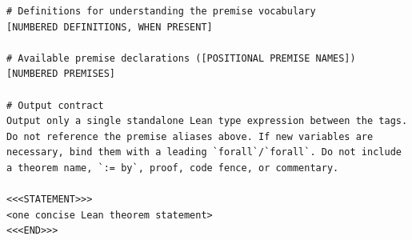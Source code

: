\begin{lstlisting}[basicstyle=\ttfamily\scriptsize,frame=single,breaklines=true]
# Definitions for understanding the premise vocabulary
[NUMBERED DEFINITIONS, WHEN PRESENT]

# Available premise declarations ([POSITIONAL PREMISE NAMES])
[NUMBERED PREMISES]

# Output contract
Output only a single standalone Lean type expression between the tags. Do not reference the premise aliases above. If new variables are necessary, bind them with a leading `forall`/`forall`. Do not include a theorem name, `:= by`, proof, code fence, or commentary.

<<<STATEMENT>>>
<one concise Lean theorem statement>
<<<END>>>
\end{lstlisting}

